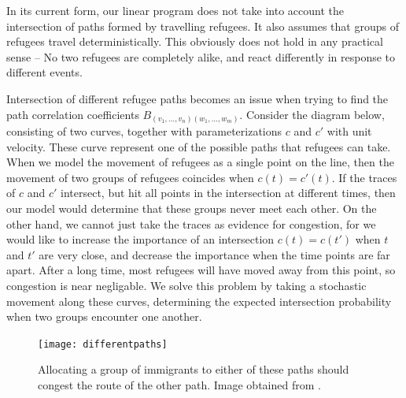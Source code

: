 \documentclass{article}
\begin{document}
\begin{enumerate}
In its current form, our linear program does not take into account the intersection of paths formed by travelling refugees. It also assumes that groups of refugees travel deterministically. This obviously does not hold in any practical sense -- No two refugees are completely alike, and react differently in response to different events.

Intersection of different refugee paths becomes an issue when trying to find the path correlation coefficients $B_{(v_1, \dots, v_n) (w_1, \dots, w_m)}$. Consider the diagram below, consisting of two curves, together with parameterizations $c$ and $c'$ with unit velocity. These curve represent one of the possible paths that refugees can take. When we model the movement of refugees as a single point on the line, then the movement of two groups of refugees coincides when $c(t) = c'(t)$. If the traces of $c$ and $c'$ intersect, but hit all points in the intersection at different times, then our model would determine that these groups never meet each other. On the other hand, we cannot just take the traces as evidence for congestion, for we would like to increase the importance of an intersection $c(t) = c(t')$ when $t$ and $t'$ are very close, and decrease the importance when the time points are far apart. After a long time, most refugees will have moved away from this point, so congestion is near negligable. We solve this problem by taking a stochastic movement along these curves, determining the expected intersection probability when two groups encounter one another.

\begin{figure}[h]
\begin{center}
\texttt{[image: differentpaths]}
\caption{Allocating a group of immigrants to either of these paths should congest the route of the other path. Image obtained from \cite{twocurve}.}
\end{center}
\end{figure}


\end{enumerate}
\end{document}
